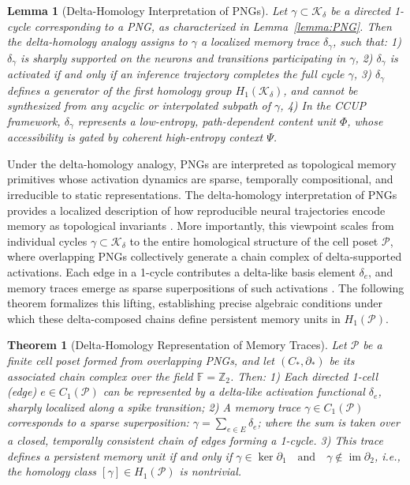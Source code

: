 \documentclass[lettersize,journal]{IEEEtran}
\newtheorem{theorem}{Theorem}
\newtheorem{lemma}{Lemma}
\begin{document}
\begin{lemma}[Delta-Homology Interpretation of PNGs]
Let \( \gamma \subset \mathcal{K}_\delta \) be a directed 1-cycle corresponding to a PNG, as characterized in Lemma~\ref{lemma:PNG}. Then the delta-homology analogy assigns to \( \gamma \) a localized memory trace \( \delta_\gamma \), such that:
1) \( \delta_\gamma \) is sharply supported on the neurons and transitions participating in \( \gamma \),
2) \( \delta_\gamma \) is activated \emph{if and only if} an inference trajectory completes the full cycle \( \gamma \),
3) \( \delta_\gamma \) defines a generator of the first homology group \( H_1(\mathcal{K}_\delta) \), and cannot be synthesized from any acyclic or interpolated subpath of \( \gamma \),
4) In the CCUP framework, \( \delta_\gamma \) represents a low-entropy, path-dependent content unit \( \Phi \), whose accessibility is gated by coherent high-entropy context \( \Psi \).
\label{lemma:DHI_PNG}
\end{lemma}

Under the delta-homology analogy, PNGs are interpreted as topological memory primitives whose activation dynamics are sparse, temporally compositional, and irreducible to static representations.
The delta-homology interpretation of PNGs provides a localized description of how reproducible neural trajectories encode memory as topological invariants \cite{izhikevich2006polychronization}. More importantly, this viewpoint scales from individual cycles \( \gamma \subset \mathcal{K}_\delta \) to the entire homological structure of the cell poset \( \mathcal{P} \), where overlapping PNGs collectively generate a chain complex of delta-supported activations. Each edge in a 1-cycle contributes a delta-like basis element \( \delta_e \), and memory traces emerge as sparse superpositions of such activations \cite{dicarlo2012does}. The following theorem formalizes this lifting, establishing precise algebraic conditions under which these delta-composed chains define persistent memory units in \( H_1(\mathcal{P}) \).


\begin{theorem}[Delta-Homology Representation of Memory Traces]
Let \( \mathcal{P} \) be a finite cell poset formed from overlapping PNGs, and let \( (C_*, \partial_*) \) be its associated chain complex over the field \( \mathbb{F} = \mathbb{Z}_2 \). Then:
1) Each directed 1-cell (edge) \( e \in C_1(\mathcal{P}) \) can be represented by a delta-like activation functional \( \delta_e \), sharply localized along a spike transition;
2) A memory trace \( \gamma \in C_1(\mathcal{P}) \) corresponds to a sparse superposition:
$\gamma = \sum_{e \in E} \delta_e$;
where the sum is taken over a closed, temporally consistent chain of edges forming a 1-cycle.
3) This trace defines a persistent memory unit if and only if
$\gamma \in \ker \partial_1 \quad \text{and} \quad \gamma \notin \operatorname{im} \partial_2$,
i.e., the homology class \( [\gamma] \in H_1(\mathcal{P}) \) is nontrivial.
\label{thm:delta_homology_representation}
\end{theorem}
\end{document}
